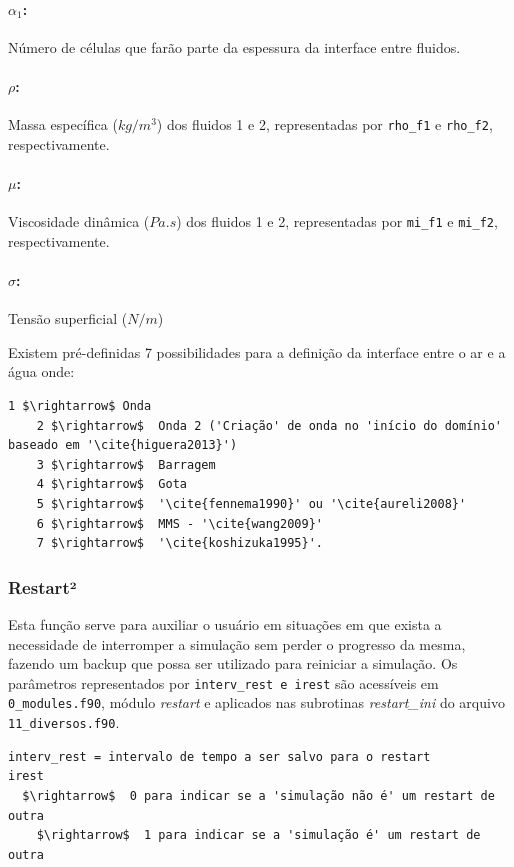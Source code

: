 \documentclass[12pt, a4paper]{article}
\begin{document}
\paragraph{$\alpha_1$:} Número de células que farão parte da espessura da interface entre fluidos.
\paragraph{$\rho$:} Massa específica ($kg/m^3$) dos fluidos 1 e 2, representadas por \verb|rho_f1| e \verb|rho_f2|, respectivamente.
\paragraph{$\mu$:} Viscosidade dinâmica ($Pa.s$) dos fluidos 1 e 2, representadas por \verb|mi_f1| e \verb|mi_f2|, respectivamente.
\paragraph{$\sigma$:} Tensão superficial ($N/m$)
\vspace{0.5cm}

Existem pré-definidas 7 possibilidades para a definição da interface entre o ar e a água onde:

\vspace{0.5cm}
\begin{lstlisting}[escapeinside='']
  1 $\rightarrow$ Onda 
	2 $\rightarrow$  Onda 2 ('Criação' de onda no 'início do domínio' baseado em '\cite{higuera2013}')
	3 $\rightarrow$  Barragem 
	4 $\rightarrow$  Gota 
	5 $\rightarrow$  '\cite{fennema1990}' ou '\cite{aureli2008}'
	6 $\rightarrow$  MMS - '\cite{wang2009}'
	7 $\rightarrow$  '\cite{koshizuka1995}'.
\end{lstlisting}

\subsubsection{Restart²}
Esta função serve para auxiliar o usuário em situações em que exista a necessidade de interromper a simulação sem perder o progresso da mesma, fazendo um backup que possa ser utilizado para reiniciar a simulação. Os parâmetros representados por \verb|interv_rest e irest| são acessíveis em \verb|0_modules.f90|, módulo \textit{restart} e aplicados nas subrotinas \textit{restart\_ini} do arquivo \verb|11_diversos.f90|.
\begin{lstlisting}[escapeinside='']
interv_rest = intervalo de tempo a ser salvo para o restart
irest	
  $\rightarrow$  0 para indicar se a 'simulação não é' um restart de outra
	$\rightarrow$  1 para indicar se a 'simulação é' um restart de outra
\end{lstlisting}
\end{document}
